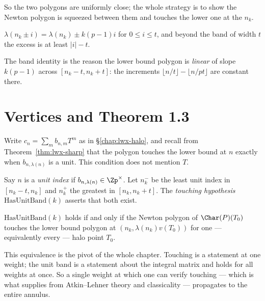So the two polygons are uniformly close; the whole strategy is to show the Newton polygon is
squeezed between them and touches the lower one at the $n_k$.

\begin{lemma}
  \label{lem:band}
  \leanok
  $\lambda(n_k\pm i) = \lambda(n_k) \pm k(p-1)i$ for $0\leq i\leq t$, and beyond the band of
  width $t$ the excess is at least $\lvert i\rvert - t$.
\end{lemma}

The band identity is the reason the lower bound polygon is \emph{linear} of slope $k(p-1)$ across
$[n_k-t, n_k+t]$: the increments $\lfloor n/t\rfloor - \lfloor n/pt\rfloor$ are constant there.

\section{Vertices and Theorem 1.3}

Write $c_n = \sum_m b_{n,m}T^{m}$ as in \S\ref{chap:lwx-halo}, and recall from
Theorem~\ref{thm:lwx-sharp} that the polygon touches the lower bound at $n$ exactly when
$b_{n,\lambda(n)}$ is a unit.  This condition does not mention $T$.

\begin{definition}
  \label{def:unitband}
  \leanok
  Say $n$ is a \emph{unit index} if $b_{n,\lambda(n)}\in\Zp^{\times}$.  Let
  $n_k^{-}$ be the least unit index in $[n_k-t, n_k]$ and $n_k^{+}$ the greatest in
  $[n_k, n_k+t]$.  The \emph{touching hypothesis} $\mathrm{HasUnitBand}(k)$ asserts that both
  exist.
\end{definition}

\begin{lemma}
  \label{lem:unitband-from-touching}
  \leanok
  $\mathrm{HasUnitBand}(k)$ holds if and only if the Newton polygon of $\Char(P)(T_0)$ touches
  the lower bound polygon at $(n_k, \lambda(n_k)v(T_0))$ for one --- equivalently every --- halo
  point $T_0$.
\end{lemma}

This equivalence is the pivot of the whole chapter.  Touching is a statement at one weight; the
unit band is a statement about the integral matrix and holds for all weights at once.  So a
single weight at which one can verify touching --- which is what \cite[\S3.23 Step I]{LWX}
supplies from Atkin--Lehner theory and classicality --- propagates to the entire annulus.

